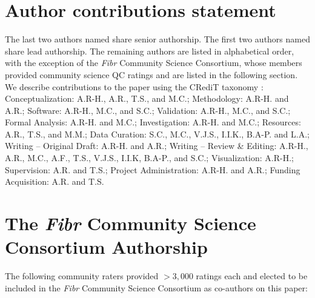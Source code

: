 \documentclass[fleqn,10pt,inline]{wlscirep}
\begin{document}
\section*{Author contributions statement}

The last two authors named share senior authorship. The first two authors named
share lead authorship. The remaining authors are listed in alphabetical order,
with the exception of the \emph{Fibr} Community Science Consortium, whose members
provided community science QC ratings and are listed in the following section.
We describe contributions to the paper using the CRediT taxonomy \cite{brand2015-vd,allen2014-oc}:
Conceptualization: A.R-H., A.R., T.S., and M.C.;
Methodology: A.R-H. and A.R.;
Software: A.R-H., M.C., and S.C.;
Validation: A.R-H., M.C., and S.C.;
Formal Analysis: A.R-H. and M.C.;
Investigation: A.R-H. and M.C.;
Resources: A.R., T.S., and M.M.;
Data Curation: S.C., M.C., V.J.S., I.I.K., B.A-P. and L.A.;
Writing – Original Draft: A.R-H. and A.R.;
Writing – Review \& Editing: A.R-H., A.R., M.C., A.F., T.S., V.J.S., I.I.K, B.A-P., and S.C.;
Visualization: A.R-H.;
Supervision: A.R. and T.S.;
Project Administration: A.R-H. and A.R.;
Funding Acquisition: A.R. and T.S.

\section*{The \emph{Fibr} Community Science Consortium Authorship
}

The following community raters provided $>3,000$ ratings each and elected to be included in the \emph{Fibr} Community Science Consortium as co-authors on this paper:
\end{document}
